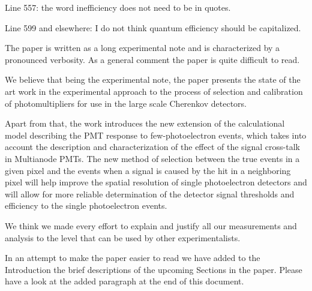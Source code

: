 \documentclass[11pt]{report}
\begin{document}
\begin{tcolorbox}[enlarge top by=2em,colbacktitle=black!60!white,colframe=black!80!white,left=0pt,right=0pt,top=0pt,bottom=0pt,boxrule=0.3pt,title=\bfseries1.13 and 1.14]
Line 557:  the word inefficiency does not need to be in quotes.

Line 599 and elsewhere:  I do not think quantum efficiency should be capitalized.
\end{tcolorbox}








\clearpage






\begin{tcolorbox}[enlarge top by=2em,colbacktitle=blue!60!white,colframe=black!80!white,left=0pt,right=0pt,top=0pt,bottom=0pt,boxrule=0.3pt,title=\bfseries2.01]
The paper is written as a long experimental note and is characterized by a pronounced verbosity. As a general comment the paper is quite difficult to read.
\end{tcolorbox}

We believe that being the experimental note, the paper presents the state of the art work in the experimental approach to the process of selection and calibration of photomultipliers for use in the large scale Cherenkov detectors. 

Apart from that, the work introduces the new extension of the calculational model describing the PMT response to few-photoelectron events, which takes into account the description and characterization of the effect of the signal cross-talk in Multianode PMTs.
The new method of selection between the true events in a given pixel and the events when a signal is caused by the hit in a neighboring pixel will help improve the spatial resolution of single photoelectron detectors and will allow for more reliable determination of the detector signal thresholds and efficiency to the single photoelectron events.

We think we made every effort to explain and justify all our measurements and analysis to the level that can be used by other experimentalists.

In an attempt to make the paper easier to read we have added to the Introduction the brief descriptions of the upcoming Sections in the paper. Please have a look at the added paragraph at the end of this document. 
\end{document}
